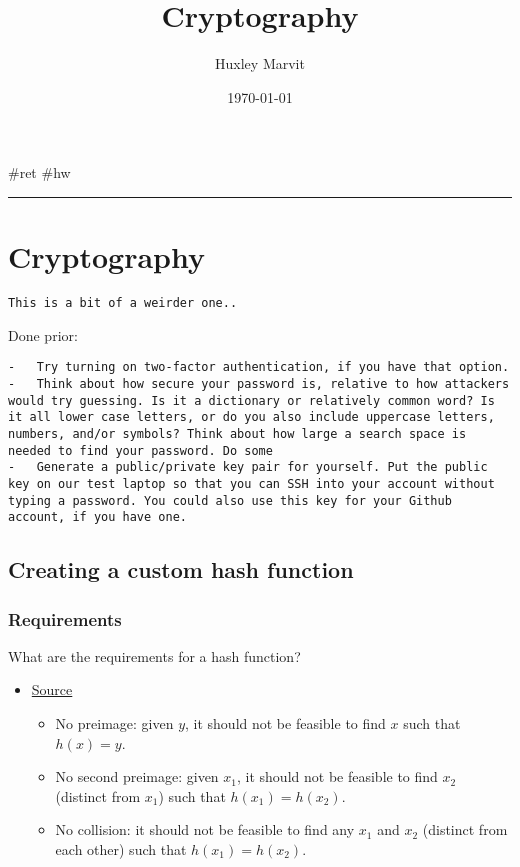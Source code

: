 \documentclass[letterpaper]{article}
\author{Huxley Marvit}
\date{\today}
\title{Cryptography}
\renewcommand{\tableofcontents}{}
\begin{document}
\tableofcontents

\#ret \#hw

\noindent\rule{\textwidth}{0.5pt}

\section{Cryptography}
\label{sec:orgf8e7ef2}
\begin{verbatim}
This is a bit of a weirder one..
\end{verbatim}

Done prior:

\begin{verbatim}
-   Try turning on two-factor authentication, if you have that option.
-   Think about how secure your password is, relative to how attackers would try guessing. Is it a dictionary or relatively common word? Is it all lower case letters, or do you also include uppercase letters, numbers, and/or symbols? Think about how large a search space is needed to find your password. Do some
-   Generate a public/private key pair for yourself. Put the public key on our test laptop so that you can SSH into your account without typing a password. You could also use this key for your Github account, if you have one.
\end{verbatim}

\subsection{Creating a custom hash function}
\label{sec:org87e7553}
\subsubsection{Requirements}
\label{sec:org7b7a394}
What are the requirements for a hash function?

\begin{itemize}
\item \href{https://stackoverflow.com/questions/2889473/when-is-it-safe-to-use-a-broken-hash-function}{Source}

\begin{itemize}
\item No preimage: given \(y\), it should not be feasible to find \(x\)
such that \(h(x) = y\).
\item No second preimage: given \(x_1\), it should not be feasible to find
\(x_2\) (distinct from \(x_1\)) such that \(h(x_1) = h(x_2)\).
\item No collision: it should not be feasible to find any \(x_1\) and
\(x_2\) (distinct from each other) such that \(h(x_1) = h(x_2)\).
\end{itemize}
\end{itemize}
\end{document}
